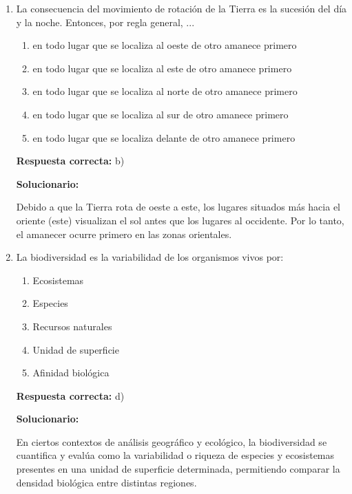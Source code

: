 \begin{enumerate}[resume]

	\item La consecuencia del movimiento de rotación de la Tierra es la sucesión del día y la noche. Entonces, por regla general, ...
	\begin{enumerate}[label=\alph*)]
		\item en todo lugar que se localiza al oeste de otro amanece primero
		\item en todo lugar que se localiza al este de otro amanece primero
		\item en todo lugar que se localiza al norte de otro amanece primero
		\item en todo lugar que se localiza al sur de otro amanece primero
		\item en todo lugar que se localiza delante de otro amanece primero
	\end{enumerate}
	\textbf{Respuesta correcta:} b)

	\vspace{2mm}
	\textbf{Solucionario:}

	Debido a que la Tierra rota de oeste a este, los lugares situados más hacia el oriente (este) visualizan el sol antes que los lugares al occidente. Por lo tanto, el amanecer ocurre primero en las zonas orientales.

	\vspace{6mm}

	\item La biodiversidad es la variabilidad de los organismos vivos por:
	\begin{enumerate}[label=\alph*)]
		\item Ecosistemas
		\item Especies
		\item Recursos naturales
		\item Unidad de superficie
		\item Afinidad biológica
	\end{enumerate}
	\textbf{Respuesta correcta:} d)

	\vspace{2mm}
	\textbf{Solucionario:}

	En ciertos contextos de análisis geográfico y ecológico, la biodiversidad se cuantifica y evalúa como la variabilidad o riqueza de especies y ecosistemas presentes en una unidad de superficie determinada, permitiendo comparar la densidad biológica entre distintas regiones.

	\vspace{6mm}

\end{enumerate}



